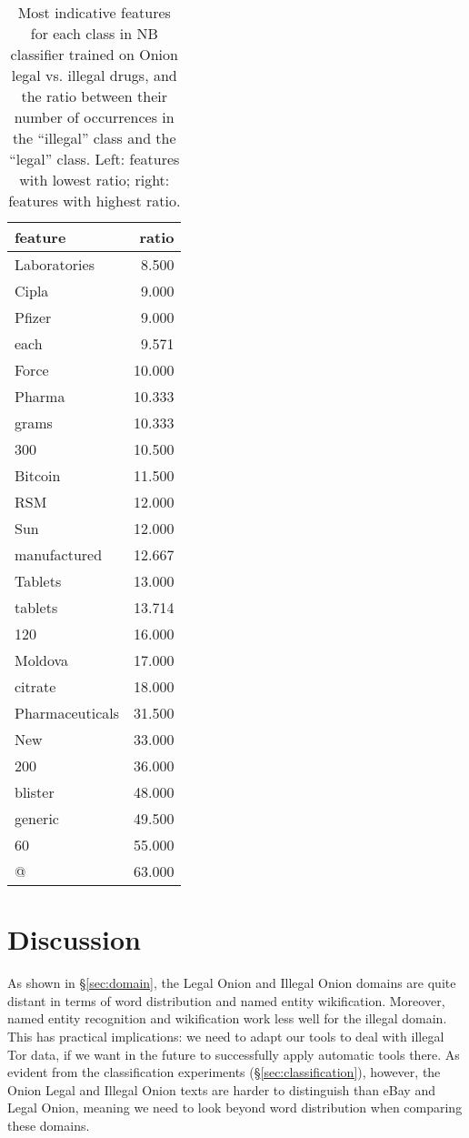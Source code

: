 \documentclass[11pt,a4paper,table]{article}
\begin{document}
{\begin{table}[t]
\begin{tabular}{lr}
feature & ratio\\
\hline
Laboratories & 8.500\\
Cipla & 9.000\\
Pfizer & 9.000\\
each & 9.571\\
Force & 10.000\\
Pharma & 10.333\\
grams & 10.333\\
300 & 10.500\\
Bitcoin & 11.500\\
RSM & 12.000\\
Sun & 12.000\\
manufactured & 12.667\\
Tablets & 13.000\\
tablets & 13.714\\
120 & 16.000\\
Moldova & 17.000\\
citrate & 18.000\\
Pharmaceuticals & 31.500\\
New & 33.000\\
200 & 36.000\\
blister & 48.000\\
generic & 49.500\\
60 & 55.000\\
@ & 63.000\\
\end{tabular}
\caption{Most indicative features for each class in NB classifier
trained on Onion legal vs. illegal drugs,
and the ratio between their number of occurrences in the ``illegal''
class and the ``legal'' class.
Left: features with lowest ratio; right: features with highest ratio.
\label{tab:nb_weights}}
\end{table}


\section{Discussion} \label{sec:discussion}

As shown in \S\ref{sec:domain}, the Legal Onion and Illegal Onion domains
are quite distant in terms of word distribution and named entity wikification.
Moreover, named entity recognition and wikification work less well
for the illegal domain.
This has practical implications: we need to adapt our tools to deal with illegal Tor data, if we want in the future to successfully apply automatic tools there.
As evident from the classification experiments (\S\ref{sec:classification}), however,
the Onion Legal and Illegal Onion texts are harder to distinguish than
eBay and Legal Onion, meaning we need to look beyond word distribution
when comparing these domains.

}
\end{document}
